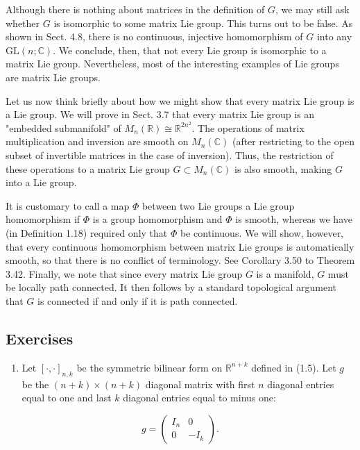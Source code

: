 \documentclass[10pt, letterpaper]{article}
\begin{document}
Although there is nothing about matrices in the definition of $G$, we may still ask whether $G$ is isomorphic to some matrix Lie group. This turns out to be false. As shown in Sect. 4.8, there is no continuous, injective homomorphism of $G$ into any $\mathrm{GL}(n ; \mathbb{C})$. We conclude, then, that not every Lie group is isomorphic to a matrix Lie group. Nevertheless, most of the interesting examples of Lie groups are matrix Lie groups.

Let us now think briefly about how we might show that every matrix Lie group is a Lie group. We will prove in Sect. 3.7 that every matrix Lie group is an "embedded submanifold" of $M_{n}(\mathbb{R}) \cong \mathbb{R}^{2 n^{2}}$. The operations of matrix multiplication and inversion are smooth on $M_{n}(\mathbb{C})$ (after restricting to the open subset of invertible matrices in the case of inversion). Thus, the restriction of these operations to a matrix Lie group $G \subset M_{n}(\mathbb{C})$ is also smooth, making $G$ into a Lie group.

It is customary to call a map $\Phi$ between two Lie groups a Lie group homomorphism if $\Phi$ is a group homomorphism and $\Phi$ is smooth, whereas we have (in Definition 1.18) required only that $\Phi$ be continuous. We will show, however, that every continuous homomorphism between matrix Lie groups is automatically smooth, so that there is no conflict of terminology. See Corollary 3.50 to Theorem 3.42. Finally, we note that since every matrix Lie group $G$ is a manifold, $G$ must be locally path connected. It then follows by a standard topological argument that $G$ is connected if and only if it is path connected.

\subsection*{Exercises}
\begin{enumerate}
  \item Let $[\cdot, \cdot]_{n, k}$ be the symmetric bilinear form on $\mathbb{R}^{n+k}$ defined in (1.5). Let $g$ be the $(n+k) \times(n+k)$ diagonal matrix with first $n$ diagonal entries equal to one and last $k$ diagonal entries equal to minus one:
\end{enumerate}

$$
g=\left(\begin{array}{rr}
I_{n} & 0 \\
0 & -I_{k}
\end{array}\right) .
$$
\end{document}
